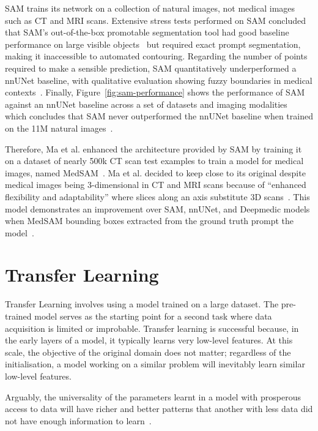 \documentclass[11pt,twoside]{report}
\begin{document}
SAM trains its network on a collection of natural images, not medical images such as CT and MRI scans. Extensive stress tests performed on SAM concluded that SAM's out-of-the-box promotable segmentation tool had good baseline performance on large visible objects~\cite{deng2023segment} but required exact prompt segmentation, making it inaccessible to automated contouring. Regarding the number of points required to make a sensible prediction, SAM quantitatively underperformed a nnUNet baseline, with qualitative evaluation showing fuzzy boundaries in medical contexts~\cite{hu2023sam}. Finally, Figure~\ref{fig:sam-performance} shows the performance of SAM against an nnUNet baseline across a set of datasets and imaging modalities~\cite{he2023computervision} which concludes that SAM never outperformed the nnUNet baseline when trained on the 11M natural images~\cite{SAM}. 

Therefore, Ma et al. enhanced the architecture provided by SAM by training it on a dataset of nearly 500k CT scan test examples to train a model for medical images, named MedSAM~\cite{Ma2024}. Ma et al. decided to keep close to its original despite medical images being 3-dimensional in CT and MRI scans because of ``enhanced flexibility and adaptability'' where slices along an axis substitute 3D scans~\cite{Ma2024}. This model demonstrates an improvement over SAM, nnUNet, and Deepmedic models when MedSAM bounding boxes extracted from the ground truth prompt the model~\cite{Ma2024}.

\section{Transfer Learning}

Transfer Learning involves using a model trained on a large dataset. The pre-trained model serves as the starting point for a second task where data acquisition is limited or improbable. Transfer learning is successful because, in the early layers of a model, it typically learns very low-level features. At this scale, the objective of the original domain does not matter; regardless of the initialisation, a model working on a similar problem will inevitably learn similar low-level features. 

Arguably, the universality of the parameters learnt in a model with prosperous access to data will have richer and better patterns that another with less data did not have enough information to learn~\cite{deep-learning-book, survey-on-transfer-learning}.
\end{document}
